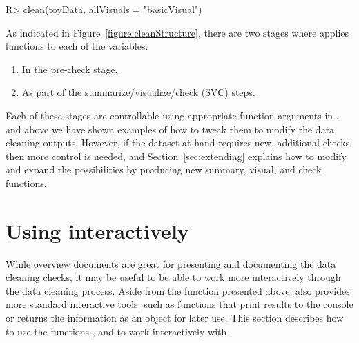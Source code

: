 \documentclass[article,shortnames]{jss}
\newcommand{\hl}[1]{\textcolor{magenta}{#1}}
\begin{document}
\begin{Schunk}
\begin{Sinput}
R> clean(toyData, allVisuals = "basicVisual")
\end{Sinput}
\end{Schunk}







As indicated in Figure~\ref{figure:cleanStructure}, there are two stages
where  applies functions to each of the variables:
\begin{enumerate}
\item In the pre-check stage.
\item As part of the summarize/visualize/check (SVC) steps.
\end{enumerate}
Each of these stages are controllable using appropriate function
arguments in , and above we have shown examples of how
to tweak them to modify the data cleaning outputs. However, if the
dataset at hand requires new, additional checks, then more control is
needed, and Section~\ref{sec:extending} explains how to modify and
expand the possibilities by producing new summary, visual, and check
functions.

\section[Using dataMaid interactively]{Using  interactively}
\label{sec:interactiveCleanR}

While overview documents are great for presenting and documenting the
data cleaning checks, it may be useful to be able to work more
interactively through the data cleaning process. Aside from
the  function presented above,  also
provides more standard  interactive tools, such as
functions that print results to the console or returns the information
as an object for later use. This section describes how to use the
functions ,  and  to
work interactively with .
\end{document}
